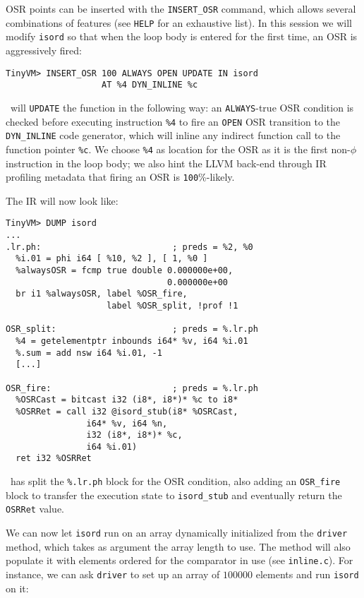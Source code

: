 OSR points can be inserted with the {\tt INSERT\_OSR} command, which allows several combinations of features (see {\tt HELP} for an exhaustive list). In this session we will modify {\tt isord} so that when the loop body is entered for the first time, an OSR is aggressively fired:

\begin{small}
\begin{verbatim}
TinyVM> INSERT_OSR 100 ALWAYS OPEN UPDATE IN isord
                   AT %4 DYN_INLINE %c
\end{verbatim}
\end{small}

\noindent \tinyvm\ will {\tt UPDATE} the function in the following way: an {\tt ALWAYS}-true OSR condition is checked before executing instruction {\tt \%4} to fire an {\tt OPEN} OSR transition to the {\tt DYN\_INLINE} code generator, which will inline any indirect function call to the function pointer {\tt \%c}. We choose {\tt \%4} as location for the OSR as it is the first non-$\phi$ instruction in the loop body; we also hint the LLVM back-end through IR profiling metadata that firing an OSR is {\tt 100}\%-likely.

The IR will now look like:

\begin{small}
\begin{verbatim}
TinyVM> DUMP isord
...
.lr.ph:                          ; preds = %2, %0
  %i.01 = phi i64 [ %10, %2 ], [ 1, %0 ]
  %alwaysOSR = fcmp true double 0.000000e+00,
                                0.000000e+00
  br i1 %alwaysOSR, label %OSR_fire,
                    label %OSR_split, !prof !1

OSR_split:                       ; preds = %.lr.ph
  %4 = getelementptr inbounds i64* %v, i64 %i.01
  %.sum = add nsw i64 %i.01, -1
  [...]

OSR_fire:                        ; preds = %.lr.ph
  %OSRCast = bitcast i32 (i8*, i8*)* %c to i8*
  %OSRRet = call i32 @isord_stub(i8* %OSRCast,
                i64* %v, i64 %n,
                i32 (i8*, i8*)* %c,
                i64 %i.01)
  ret i32 %OSRRet
\end{verbatim}
\end{small}

\noindent\osrkit\ has split the {\tt \%.lr.ph} block for the OSR condition, also adding an {\tt OSR\_fire} block to transfer the execution state to {\tt isord\_stub} and eventually return the {\tt OSRRet} value. 

We can now let {\tt isord} run on an array dynamically initialized from the {\tt driver} method, which takes as argument the array length to use. The method will also populate it with elements ordered for the comparator in use (see {\small\tt inline.c}). For instance, we can ask {\tt driver} to set up an array of $100000$ elements and run {\tt isord} on it:

